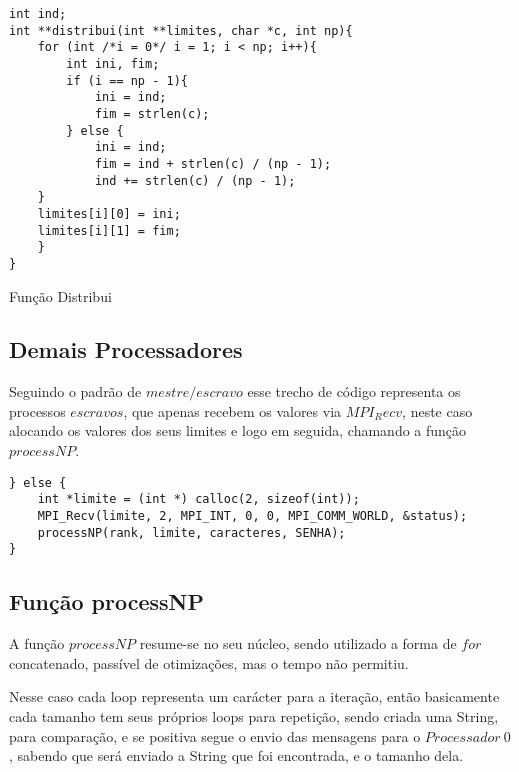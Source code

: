\documentclass[10pt,journal,compsoc]{IEEEtran}
\begin{document}
\begin{listing}[ht]
\begin{verbatim}
int ind;
int **distribui(int **limites, char *c, int np){
    for (int /*i = 0*/ i = 1; i < np; i++){
        int ini, fim;
        if (i == np - 1){
            ini = ind;
            fim = strlen(c);
        } else {
            ini = ind;
            fim = ind + strlen(c) / (np - 1);
            ind += strlen(c) / (np - 1);
    }
    limites[i][0] = ini;
    limites[i][1] = fim;
    }
}
\end{verbatim}
\caption{Função Distribui}
\end{listing}

\subsection{Demais Processadores}
\label{sec:demaisProcessadores}    
Seguindo o padrão de $mestre/escravo$ esse trecho de código representa os processos $escravos$, que apenas recebem os valores via $MPI_Recv$, neste caso alocando os valores dos seus limites e logo em seguida, chamando a função $processNP$.

\begin{verbatim}
} else {
    int *limite = (int *) calloc(2, sizeof(int));
    MPI_Recv(limite, 2, MPI_INT, 0, 0, MPI_COMM_WORLD, &status);
    processNP(rank, limite, caracteres, SENHA);
}
\end{verbatim}

\subsection{Função processNP}
\label{sec:processNP}
A função $processNP$ resume-se no seu núcleo, sendo utilizado a forma de $for$ concatenado, passível de otimizações, mas o tempo não permitiu.

Nesse caso cada loop representa um carácter para a iteração, então basicamente cada tamanho tem seus próprios loops para repetição, sendo criada uma String, para comparação, e se positiva segue o envio das mensagens para o $Processador~0$, sabendo que será enviado a String que foi encontrada, e o tamanho dela.
\end{document}
